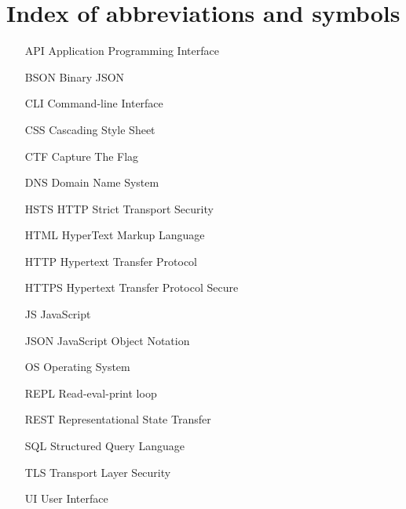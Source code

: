 
\chapter{Index of abbreviations and symbols}

\begin{itemize}
	\item[API] Application Programming Interface
	\item[BSON] Binary JSON
	\item[CLI] Command-line Interface
	\item[CSS] Cascading Style Sheet
	\item[CTF] Capture The Flag
	\item[DNS] Domain Name System
	\item[HSTS] HTTP Strict Transport Security
	\item[HTML] HyperText Markup Language
	\item[HTTP] Hypertext Transfer Protocol
	\item[HTTPS] Hypertext Transfer Protocol Secure
	\item[JS] JavaScript
	\item[JSON] JavaScript Object Notation
	\item[OS] Operating System
	\item[REPL] Read-eval-print loop
	\item[REST] Representational State Transfer
	\item[SQL] Structured Query Language
	\item[TLS] Transport Layer Security
	\item[UI] User Interface
\end{itemize}
